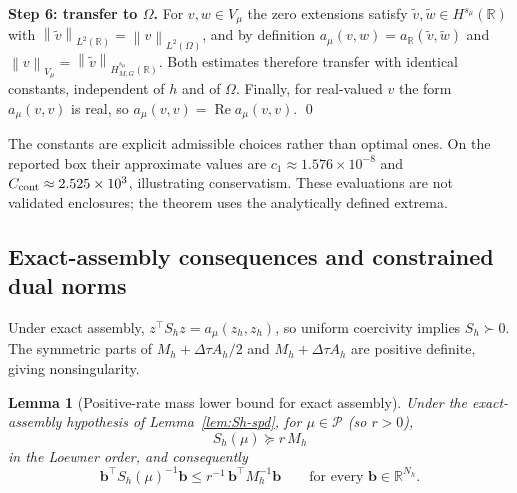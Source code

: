 \documentclass[11pt]{amsart}
\newtheorem{lemma}[theorem]{Lemma}
\theoremstyle{remark}
\newcommand{\R}{\mathbb{R}}
\newcommand{\Pset}{\mathcal{P}}
\newcommand{\Vmu}{V_{\mu}}
\newcommand{\Mh}{M_h}
\newcommand{\Ah}{A_h}
\newcommand{\Sh}{S_h}
\newcommand{\norm}[1]{\left\lVert #1\right\rVert}
\newcommand{\dt}{\Delta\tau}
\newcommand{\bb}{\mathbf b}
\newcommand{\rf}{r}
\DeclareMathOperator{\Real}{Re}
\begin{document}
\medskip\noindent
\textbf{Step 6: transfer to $\Omega$.}
For $v,w\in\Vmu$ the zero extensions satisfy
$\widetilde v,\widetilde w\in H^{s_\mu}(\R)$ with
$\norm{\widetilde v}_{L^2(\R)}=\norm{v}_{L^2(\Omega)}$, and by definition
$a_\mu(v,w)=a_\R(\widetilde v,\widetilde w)$ and
$\norm{v}_{\Vmu}=\norm{\widetilde v}_{H^{s_\mu}_{M,G}(\R)}$.  Both estimates
therefore transfer with identical constants, independent of $h$ and of
$\Omega$.  Finally, for real-valued $v$ the form $a_\mu(v,v)$ is real, so
$a_\mu(v,v)=\Real a_\mu(v,v)$.  \qed


The constants are explicit admissible choices rather than optimal ones.
On the reported box their approximate values are
$c_1\approx1.576\times10^{-8}$ and
$C_{\rm cont}\approx2.525\times10^3$, illustrating conservatism.
These evaluations are not validated enclosures; the theorem uses the
analytically defined extrema.

\subsection{Exact-assembly consequences and constrained dual norms}
\label{ssec:exact-assembly}\label{lem:Sh-spd}\label{eq:Sh-spd}
Under exact assembly, $z^\top\Sh z=a_\mu(z_h,z_h)$, so uniform coercivity
implies $\Sh\succ0$. The symmetric parts of $\Mh+\dt\Ah/2$ and
$\Mh+\dt\Ah$ are positive definite, giving nonsingularity.
\begin{lemma}[Positive-rate mass lower bound for exact assembly]
\label{lem:mass-lower}
Under the exact-assembly hypothesis of Lemma~\ref{lem:Sh-spd}, for
$\mu\in\Pset$ (so $\rf>0$),
\begin{equation}
  \Sh(\mu)\succeq \rf\,\Mh
  \label{eq:S-ge-rM}
\end{equation}
in the Loewner order, and consequently
\begin{equation}
  \bb^\top\Sh(\mu)^{-1}\bb\le \rf^{-1}\,\bb^\top\Mh^{-1}\bb
  \qquad\text{for every }\bb\in\R^{N_h}.
  \label{eq:mass-upper}
\end{equation}
\end{lemma}
\end{document}
